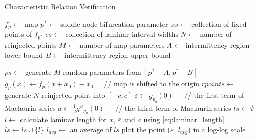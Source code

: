 \begin{algorithm}[!h]
    \caption{Characteristic Relation Verification}
    \label{alg:char_rel}
    \begin{algorithmic}[1]
        \Statex $f_{p} \gets$ map
        \Statex $p^{*} \gets$ saddle-node bifurcation parameter
        \Statex $xs \gets$ collection of fixed points of $f_{p^{*}}$
        \Statex $cs \gets$ collection of laminar interval widths
        \Statex $N \gets$ number of reinjected points
        \Statex $M \gets$ number of map parameters
        \Statex $A \gets$ intermittency region lower bound
        \Statex $B \gets$ intermittency region upper bound

        \State $ps \gets$ generate $M$ random parameters from $[p^{*}-A, p^{*}-B]$
            \State $g_{p}(x) \gets f_{p}(x + x_0) - x_0$   $\;\;\;$ // map is shifted to the origin
                    \State $rpoints \gets$ generate $N$ reinjected point into $[-c, c]$
                    \State $\varepsilon \gets g_{p_{0}}(0)$  $\;\;\;$   // the first term of Maclaurin series
                    \State $a \gets \frac{1}{2}g''_{p_{0}}(0)$  $\;\;\;$  // the third term of Maclaurin series
                    \State $ls \gets \emptyset$
                        \State $l \gets$ calculate laminar length for $x$, $\varepsilon$ and $a$ using \eqref{eq:laminar_length}
                        \State $ls \gets ls \cup \{l\}$
                    \EndFor
                    \State $l_{avg} \gets$ an average of $ls$
                    \State plot the point ($\varepsilon$, $l_{avg}$) in a log-log scale
                \EndFor
            \EndFor
        \EndFor
    \end{algorithmic}
\end{algorithm}


